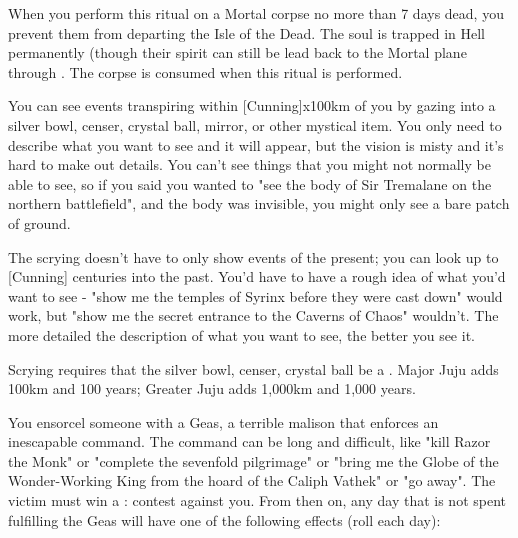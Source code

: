 {\OCCULT[
  Name=Damning,
  Link=occultism-damning,
  Success=9,
  Cost=666\AG
]

When you perform this ritual on a Mortal corpse no more than 7 days dead, you prevent them from departing the Isle of the Dead.  The soul is trapped in Hell permanently (though their spirit can still be lead back to the Mortal plane through .  The corpse is consumed when this ritual is performed.


\OCCULT[
  Name=Descry,
  Link=occultism-descry,
  Success=3+,
  Cost=See below
]

You can see events transpiring within [Cunning]x100km of you by gazing into a silver bowl, censer, crystal ball, mirror, or other mystical item.  You only need to describe what you want to see and it will appear, but the vision is misty and it's hard to make out details.  You can't see things that you might not normally be able to see, so if you said you wanted to "see the body of Sir Tremalane on the northern battlefield", and the body was invisible, you might only see a bare patch of ground.  

The scrying doesn't have to only show events of the present; you can look up to [Cunning] centuries into the past.  You'd have to have a rough idea of what you'd want to see - "show me the temples of Syrinx before they were cast down" would work, but "show me the secret entrance to the Caverns of Chaos" wouldn't.  The more detailed the description of what you want to see, the better you see it.

Scrying requires that the silver bowl, censer, crystal ball be a .  Major Juju adds 100km and 100 years; Greater Juju adds 1,000km and 1,000 years.


\OCCULT[
  Name=Geas,
  Link=occultism-geas,
  Success=12,
  Cost=666\AU
]


You ensorcel someone with a Geas, a terrible malison that enforces an inescapable command. The command can be long and difficult, like "kill Razor the Monk" or "complete the sevenfold pilgrimage" or "bring me the Globe of the Wonder-Working King from the hoard of the Caliph Vathek" or "go away". The victim must win a \RB : \FOC contest against you.  From then on, any day that is not spent fulfilling the Geas will have one of the following effects (roll each day):

}
